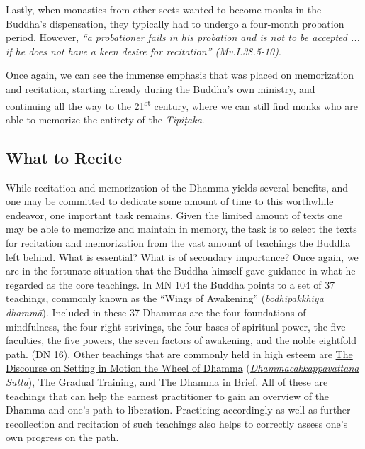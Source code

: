 Lastly, when monastics from other sects wanted to become monks in the Buddha's dispensation, they typically had to undergo a four-month probation period. However, \textit{``a probationer fails in his probation and is not to be accepted ... if he does not have a keen desire for recitation'' (Mv.I.38.5-10)}.

Once again, we can see the immense emphasis that was placed on memorization and recitation, starting already during the Buddha's own ministry, and continuing all the way to the 21\textsuperscript{st} century, where we can still find monks who are able to memorize the entirety of the \textit{Tipiṭaka}.

\subsection*{What to Recite}

While recitation and memorization of the Dhamma yields several benefits, and one may be committed to dedicate some amount of time to this worthwhile endeavor, one important task remains. Given the limited amount of texts one may be able to memorize and maintain in memory, the task is to select the texts for recitation and memorization from the vast amount of teachings the Buddha left behind. What is essential? What is of secondary importance? Once again, we are in the fortunate situation that the Buddha himself gave guidance in what he regarded as the core teachings. In MN 104 the Buddha points to a set of 37 teachings, commonly known as the ``Wings of Awakening'' (\textit{bodhipakkhiyā dhammā}). Included in these 37 Dhammas are the four foundations of mindfulness, the four right strivings, the four bases of spiritual power, the five faculties, the five powers, the seven factors of awakening, and the noble eightfold path. (DN 16). Other teachings that are commonly held in high esteem are \hyperref[wheel-of-dhamma-full]{The Discourse on Setting in Motion the Wheel of Dhamma} (\hyperref[dhammacakkappavattana-full]{\textit{Dhammacakkappavattana Sutta}}), \hyperref[gradual-training]{The Gradual Training}, and \hyperref[dhamma-in-brief]{The Dhamma in Brief}. All of these are teachings that can help the earnest practitioner to gain an overview of the Dhamma and one's path to liberation. Practicing accordingly as well as further recollection and recitation of such teachings also helps to correctly assess one's own progress on the path.

